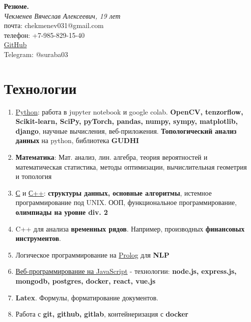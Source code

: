 \documentclass[a4paper,12pt]{article}
\date{}
\begin{document}
\begin{titlepage}
   \begin{center}
      \Large\textbf{Резюме.}\\
      \large\textit{ Чекменев Вячеслав Алексеевич, 19 лет}\\
      \large почта: chekmenev031@gmail.com \\
      \large телефон: +7-985-829-15-40 \\
      \large \href{https://github.com/Suraba03}{GitHub} \\
      \large Telegram: @suraba03\\
   \end{center}
\end{titlepage}

\section{Технологии}
\begin{enumerate}
    \item \underline{Python}: работа в jupyter notebook и google colab. \textbf{ OpenCV, tenzorflow, Scikit-learn, SciPy, pyTorch, pandas, numpy, sympy, matplotlib, django}, научные вычисления, веб-приложения. \textbf{Топологический анализ данных} на python, библиотека \textbf{GUDHI}
    \item \textbf{Математика}: Мат. анализ, лин. алгебра, теория вероятностей и математическая статистика, методы оптимизации, вычислительная геометрия и топология
    \item \underline{С} и \underline{С++}: \textbf{структуры данных, основные алгоритмы}, истемное программирование под UNIX. ООП, функциональное программирование, \textbf{олимпиады на уровне div. 2} 
    \item C++ для анализа \textbf{временных рядов}. Например, производных \textbf{финансовых инструментов}.
    \item Логическое программирование на \underline{Prolog} для \textbf{NLP}
    \item \underline{Веб-программирование на JavaScript} - технологии: \textbf{node.js, express.js, mongodb, postgres, docker, react, vue.js}
    \item \textbf{Latex}. Формулы, форматирование документов.
    \item Работа с \textbf{git, github, gitlab}, контейнеризация с \textbf{docker}

\end{enumerate}
\end{document}
